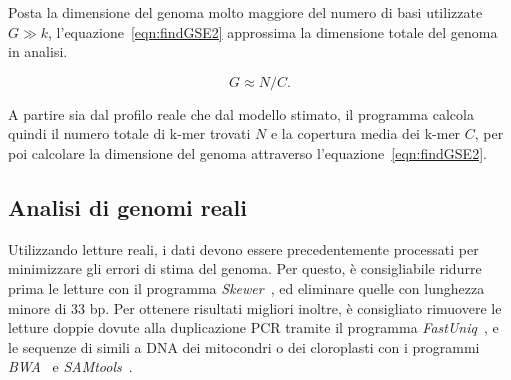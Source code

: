 \documentclass[crop=false, class=book]{standalone}
\begin{document}
	
	Posta la dimensione del genoma molto maggiore del numero di basi utilizzate $G\gg k$, l'equazione~\vref{eqn:findGSE2} approssima la dimensione totale del genoma in analisi.
	
	\begin{equation}
		\label{eqn:findGSE2}
		G\approx N/C.
	\end{equation}

	A partire sia dal profilo reale che dal modello stimato, il programma calcola quindi il numero totale di k-mer trovati $N$ e la copertura media dei k-mer $C$, per poi calcolare la dimensione del genoma attraverso l'equazione~\vref{eqn:findGSE2}.
	
	
	\subsection{Analisi di genomi reali}
	Utilizzando letture reali, i dati devono essere precedentemente processati per minimizzare gli errori di stima del genoma. Per questo, è consigliabile ridurre prima le letture con il programma \textit{Skewer}~\cite{jiang2014skewer}, ed eliminare quelle con lunghezza minore di 33 bp. Per ottenere risultati migliori inoltre, è consigliato rimuovere le letture doppie dovute alla duplicazione PCR tramite il programma \textit{FastUniq}~\cite{xu2012fastuniq}, e le sequenze di simili a DNA dei mitocondri o dei cloroplasti con i programmi \textit{BWA}~\cite{li2009fast} e \textit{SAMtools}~\cite{li2009sequence}.
\end{document}
